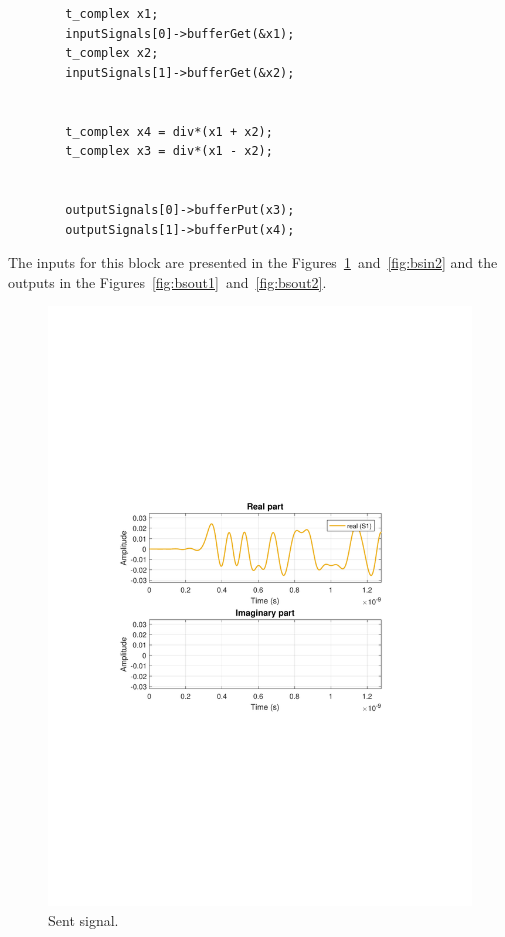 \documentclass{article}
\begin{document}
\begin{verbatim}
		t_complex x1;
		inputSignals[0]->bufferGet(&x1);
		t_complex x2;
		inputSignals[1]->bufferGet(&x2);

		
		t_complex x4 = div*(x1 + x2);
		t_complex x3 = div*(x1 - x2);

		
		outputSignals[0]->bufferPut(x3);
		outputSignals[1]->bufferPut(x4);
\end{verbatim}

The inputs for this block are presented in the Figures~\ref{fig:bsin1}~and~\ref{fig:bsin2} and the outputs in the Figures~\ref{fig:bsout1}~and~\ref{fig:bsout2}.

\begin{figure}[H]
\centering
\includegraphics[width=\linewidth, trim= 0mm 100mm 0mm 100mm, clip]{sentsig.pdf}
\caption{Sent signal.}
\label{fig:bsin1}
\end{figure}
\end{document}
